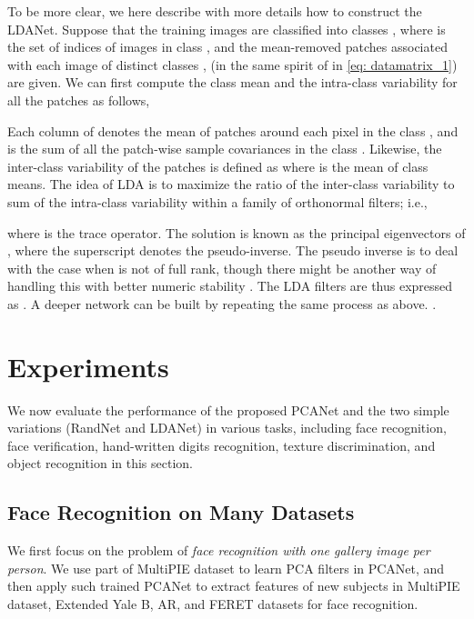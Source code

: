 \documentclass[10pt,journal,compsoc]{IEEEtran}
\begin{document}
To be more clear, we here describe with more details how to construct the LDANet. Suppose that the  training images are classified into  classes ,  where  is the set of indices of images in class , and the mean-removed patches associated with each image of distinct classes ,  (in the same spirit of  in \eqref{eq: datamatrix_1}) are given. We can first compute the class mean  and the intra-class variability  for all the patches as follows,

Each column of  denotes the mean of patches around each pixel in the class , and  is the sum of all the patch-wise sample covariances in the class . Likewise, the inter-class variability of the patches is defined as
where  is the mean of class means. The idea of LDA is to maximize the ratio of the inter-class variability to sum of the intra-class variability within a family of orthonormal filters; i.e.,

where  is the trace operator. The solution is known as the  principal eigenvectors of , where the superscript  denotes the pseudo-inverse. The pseudo inverse is to deal with the case when  is not of full rank, though there might be another way of handling this with better numeric stability \cite{Yu2001}. The LDA filters are thus expressed as . A deeper network can be built by repeating the same process as above. .


\section{Experiments}\label{sec: experiments}
We now evaluate the performance of the proposed PCANet and the two simple variations (RandNet and LDANet) in various tasks, including face recognition, face verification, hand-written digits recognition, texture discrimination, and object recognition in this section.

\subsection{Face Recognition on Many Datasets}
We first focus on the problem of {\it face recognition with one gallery image per person}. We use part of MultiPIE dataset to learn PCA filters in PCANet, and then apply such trained PCANet to extract features of new subjects in MultiPIE dataset, Extended Yale B, AR, and FERET datasets for face recognition.
\end{document}
